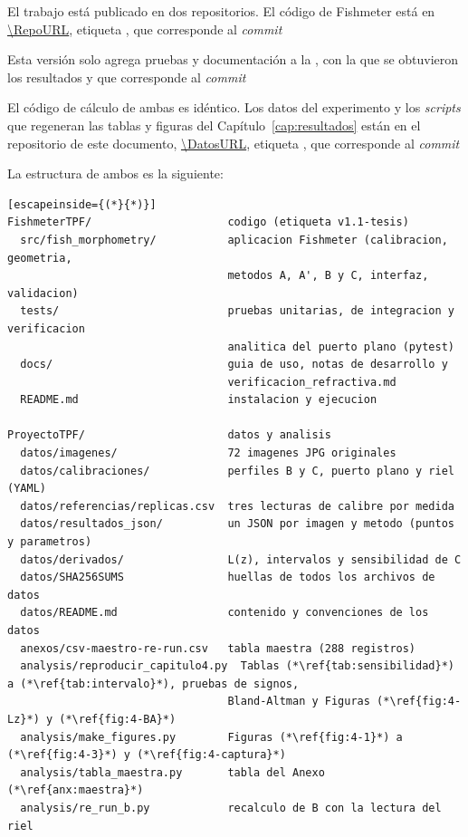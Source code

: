 El trabajo está publicado en dos repositorios. El código de Fishmeter está en \url{\RepoURL}, etiqueta \texttt{\RepoTag}, que corresponde al \emph{commit}\par\noindent{\footnotesize\texttt{\RepoCommit}}\par
\noindent Esta versión solo agrega pruebas y documentación a la \texttt{\RepoTagBase}, con la que se obtuvieron los resultados y que corresponde al \emph{commit}\par\noindent{\footnotesize\texttt{\RepoCommitBase}}\par
\noindent El código de cálculo de ambas es idéntico. Los datos del experimento y los \emph{scripts} que regeneran las tablas y figuras del Capítulo~\ref{cap:resultados} están en el repositorio de este documento, \url{\DatosURL}, etiqueta \texttt{\DatosTag}, que corresponde al \emph{commit}\par\noindent{\footnotesize\texttt{\DatosCommit}}\par\noindent La estructura de ambos es la siguiente:

\begin{lstlisting}[escapeinside={(*}{*)}]
FishmeterTPF/                     codigo (etiqueta v1.1-tesis)
  src/fish_morphometry/           aplicacion Fishmeter (calibracion, geometria,
                                  metodos A, A', B y C, interfaz, validacion)
  tests/                          pruebas unitarias, de integracion y verificacion
                                  analitica del puerto plano (pytest)
  docs/                           guia de uso, notas de desarrollo y
                                  verificacion_refractiva.md
  README.md                       instalacion y ejecucion

ProyectoTPF/                      datos y analisis
  datos/imagenes/                 72 imagenes JPG originales
  datos/calibraciones/            perfiles B y C, puerto plano y riel (YAML)
  datos/referencias/replicas.csv  tres lecturas de calibre por medida
  datos/resultados_json/          un JSON por imagen y metodo (puntos y parametros)
  datos/derivados/                L(z), intervalos y sensibilidad de C
  datos/SHA256SUMS                huellas de todos los archivos de datos
  datos/README.md                 contenido y convenciones de los datos
  anexos/csv-maestro-re-run.csv   tabla maestra (288 registros)
  analysis/reproducir_capitulo4.py  Tablas (*\ref{tab:sensibilidad}*) a (*\ref{tab:intervalo}*), pruebas de signos,
                                  Bland-Altman y Figuras (*\ref{fig:4-Lz}*) y (*\ref{fig:4-BA}*)
  analysis/make_figures.py        Figuras (*\ref{fig:4-1}*) a (*\ref{fig:4-3}*) y (*\ref{fig:4-captura}*)
  analysis/tabla_maestra.py       tabla del Anexo (*\ref{anx:maestra}*)
  analysis/re_run_b.py            recalculo de B con la lectura del riel
\end{lstlisting}

